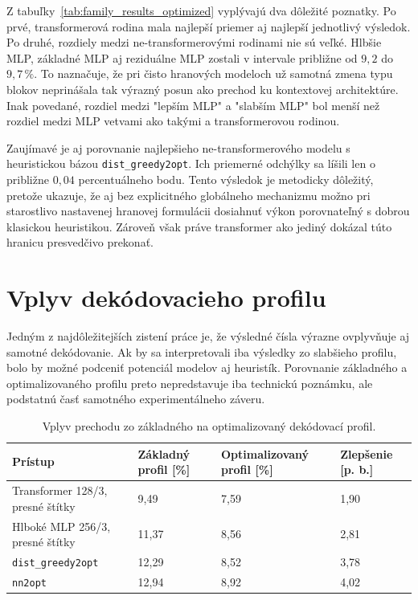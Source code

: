 \indent Z tabuľky~\ref{tab:family_results_optimized} vyplývajú dva dôležité
poznatky. Po prvé, transformerová rodina mala najlepší priemer aj najlepší
jednotlivý výsledok. Po druhé, rozdiely medzi ne-transformerovými rodinami nie
sú veľké. Hlbšie MLP, základné MLP aj reziduálne MLP zostali v intervale približne
od \(9{,}2\) do \(9{,}7\,\%\). To naznačuje, že pri čisto hranových modeloch
už samotná zmena typu blokov neprinášala tak výrazný posun ako prechod ku
kontextovej architektúre. Inak povedané, rozdiel medzi "lepším MLP" a "slabším
MLP" bol menší než rozdiel medzi MLP vetvami ako takými a transformerovou
rodinou.

\indent Zaujímavé je aj porovnanie najlepšieho ne-transformerového modelu s
heuristickou bázou \texttt{dist\_greedy2opt}. Ich priemerné odchýlky sa líšili
len o približne \(0{,}04\) percentuálneho bodu. Tento výsledok je metodicky
dôležitý, pretože ukazuje, že aj bez explicitného globálneho mechanizmu možno pri
starostlivo nastavenej hranovej formulácii dosiahnuť výkon porovnateľný s dobrou
klasickou heuristikou. Zároveň však práve transformer ako jediný dokázal túto
hranicu presvedčivo prekonať.

\section{Vplyv dekódovacieho profilu}
\indent Jedným z najdôležitejších zistení práce je, že výsledné čísla výrazne
ovplyvňuje aj samotné dekódovanie. Ak by sa interpretovali iba výsledky zo
slabšieho profilu, bolo by možné podceniť potenciál modelov aj heuristík.
Porovnanie základného a optimalizovaného profilu preto nepredstavuje iba
technickú poznámku, ale podstatnú časť samotného experimentálneho záveru.

\begin{table}[H]
    \centering
    \footnotesize
    \caption{Vplyv prechodu zo základného na optimalizovaný dekódovací profil.}
    \label{tab:decode_profile_impact}
    \begin{tabular}{|R{4.8cm}|R{2.3cm}|R{2.4cm}|R{2.0cm}|}
        \hline
        Prístup & Základný profil [\%] & Optimalizovaný profil [\%] & Zlepšenie [p. b.] \\
        \hline
        Transformer 128/3, presné štítky & 9,49 & 7,59 & 1,90 \\
        \hline
        Hlboké MLP 256/3, presné štítky & 11,37 & 8,56 & 2,81 \\
        \hline
        \texttt{dist\_greedy2opt} & 12,29 & 8,52 & 3,78 \\
        \hline
        \texttt{nn2opt} & 12,94 & 8,92 & 4,02 \\
        \hline
    \end{tabular}
    \normalsize
\end{table}

